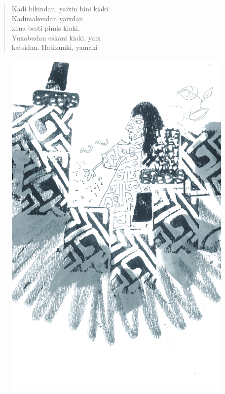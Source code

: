 \begin{verse}
Kadi bikindan, yaixin bini kiaki.\\
Kadimakendan yaixdan\\
xena besti pimis kiaki.\\
Yuxabudan eskani kiaki, yaix\\
katsidan. Hatixunki, yamaki
\end{verse}

\vspace*{\fill}

\pagebreak
\thispagestyle{empty}
\begin{figure}[H]
\vspace*{-1.6cm}
\hspace*{-2.2cm}\includegraphics[width=138mm]{./imgs/img13.jpg}
\end{figure}



